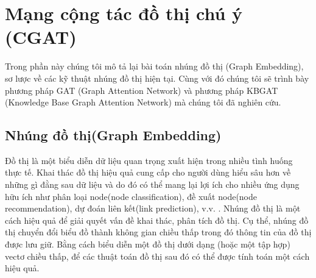 \section{Mạng cộng tác đồ thị chú ý (CGAT)}
Trong phần này chúng tôi mô tả lại bài toán nhúng đồ thị (Graph Embedding), sơ lược về các kỹ thuật nhúng đồ thị hiện tại. Cùng với đó chúng tôi sẽ trình bày phương pháp GAT (Graph Attention Network) và phương pháp KBGAT (Knowledge Base Graph Attention Network) mà chúng tôi đã nghiên cứu.

\subsection{Nhúng đồ thị(Graph Embedding)}
Đồ thị là một biểu diễn dữ liệu quan trọng xuất hiện trong nhiều tình huống thực tế. Khai thác đồ thị hiệu quả cung cấp cho người dùng hiểu sâu hơn về những gì đằng sau dữ liệu và do đó có thể mang lại lợi ích cho nhiều ứng dụng hữu ích như phân loại node(node classification), đề xuất node(node recommendation), dự đoán liên kết(link prediction), v.v. . Nhúng đồ thị là một cách hiệu quả để giải quyết vấn đề khai thác, phân tích đồ thị. Cụ thể, nhúng đồ thị chuyển đổi biểu đồ thành không gian chiều thấp trong đó thông tin của đồ thị được lưu giữ. Bằng cách biểu diễn một đồ thị dưới dạng (hoặc một tập hợp) vectơ chiều thấp, để các thuật toán đồ thị sau đó có thể được tính toán một cách hiệu quả.

